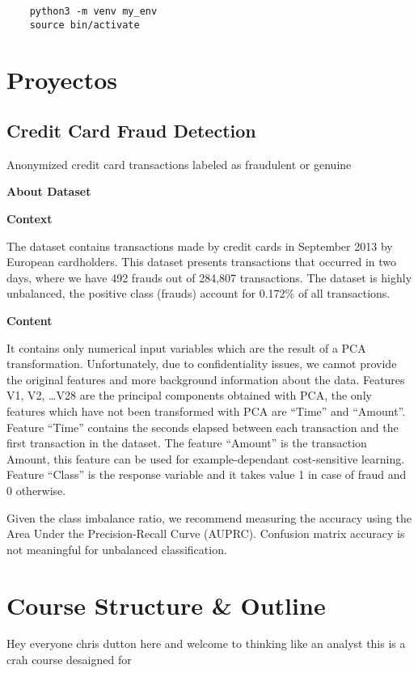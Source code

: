 \begin{verbatim}
	python3 -m venv my_env
	source bin/activate
\end{verbatim}




\chapter{Proyectos}

\section{Credit Card Fraud Detection}
Anonymized credit card transactions labeled as fraudulent or genuine

	{\LARGE\bf  About Dataset}


	{\large\bf Context}

The dataset contains transactions made by credit cards in September 2013 by European cardholders.
This dataset presents transactions that occurred in two days, where we have 492 frauds out of 284,807 transactions.
The dataset is highly unbalanced, the positive class (frauds) account for 0.172\% of all transactions.

	{\large\bf Content}

It contains only numerical input variables which are the result of a PCA transformation.
Unfortunately, due to confidentiality issues, we cannot provide the original features and more background information about the data.
Features V1, V2, \ldots V28 are the principal components obtained with PCA, the only features which have not been transformed
with PCA are ``Time'' and ``Amount''. Feature ``Time'' contains the seconds elapsed between each transaction and the first transaction
in the dataset. The feature ``Amount'' is the transaction Amount, this feature can be used for example-dependant cost-sensitive learning.
Feature ``Class'' is the response variable and it takes value 1 in case of fraud and 0 otherwise.

Given the class imbalance ratio, we recommend measuring the accuracy using the Area Under the Precision-Recall Curve (AUPRC).
Confusion matrix accuracy is not meaningful for unbalanced classification.

\chapter{Course Structure \& Outline}


Hey everyone chris dutton here and welcome to thinking like an analyst this is a crah course desaigned for

